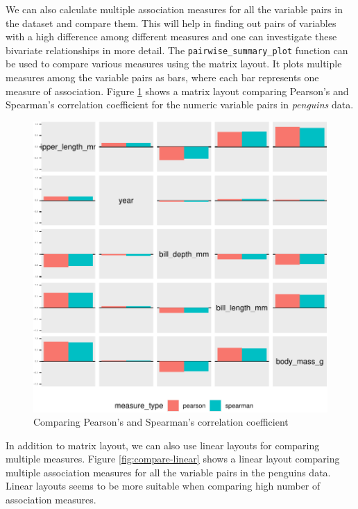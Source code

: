 We can also calculate multiple association measures for all the variable
pairs in the dataset and compare them. This will help in finding out
pairs of variables with a high difference among different measures and
one can investigate these bivariate relationships in more detail. The
\texttt{pairwise\_summary\_plot} function can be used to compare various
measures using the matrix layout. It plots multiple measures among the
variable pairs as bars, where each bar represents one measure of
association. Figure \ref{fig:compare-matrix} shows a matrix layout
comparing Pearson's and Spearman's correlation coefficient for the
numeric variable pairs in \emph{penguins} data.

\begin{Schunk}
\begin{figure}

{\centering \includegraphics{rj_paper_files/figure-latex/compare-matrix-1} 

}

\caption[Comparing Pearson's and Spearman's correlation coefficient]{Comparing Pearson's and Spearman's correlation coefficient}\label{fig:compare-matrix}
\end{figure}
\end{Schunk}

In addition to matrix layout, we can also use linear layouts for
comparing multiple measures. Figure \ref{fig:compare-linear} shows a
linear layout comparing multiple association measures for all the
variable pairs in the penguins data. Linear layouts seems to be more
suitable when comparing high number of association measures.

